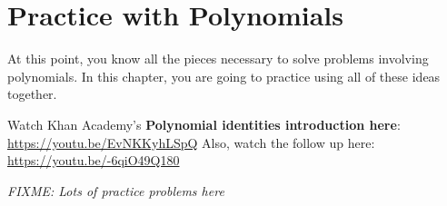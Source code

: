 \chapter{Practice with Polynomials}

At this point, you know all the pieces necessary to solve problems
involving polynomials. In this chapter, you are going to practice
using all of these ideas together.

Watch Khan Academy's \textbf{Polynomial identities introduction here}: \url{https://youtu.be/EvNKKyhLSpQ}
Also, watch the follow up here: \url{https://youtu.be/-6qiO49Q180}

\textit{FIXME: Lots of practice problems here}
